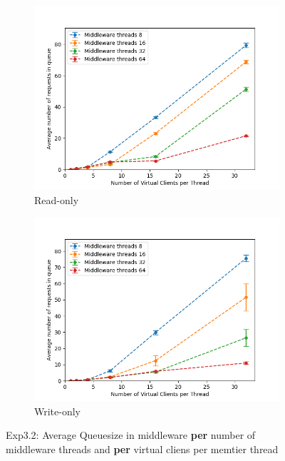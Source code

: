 \documentclass[11pt,a4paper]{article}
\begin{document}
\begin{figure}[H]
\centering
\begin{subfigure}{.45\textwidth}
    \centering
    \includegraphics[width=\textwidth]{img/exp3_2/exp3_2__queuesize_middleware_write_0.png}
    \caption{Read-only}
    \label{fig:mesh1}
\end{subfigure}%
\begin{subfigure}{.45\textwidth}
      \centering
    \includegraphics[width=\textwidth]{img/exp3_2/exp3_2__queuesize_middleware_write_1.png}
    \caption{Write-only}
    \label{fig:mesh1}
\end{subfigure}
\caption{Exp3.2: Average Queuesize in middleware \textbf{per} number of middleware threads and \textbf{per} virtual cliens per memtier thread}
\label{fig:test}
\end{figure}
\end{document}
